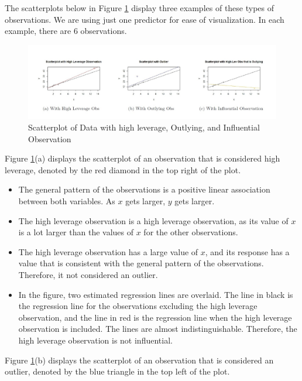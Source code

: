 \documentclass[
]{book}
\providecommand{\tightlist}{%
  \setlength{\itemsep}{0pt}\setlength{\parskip}{0pt}}
\begin{document}
The scatterplots below in Figure \ref{fig:10plots} display three examples of these types of observations. We are using just one predictor for ease of visualization. In each example, there are 6 observations.

\begin{figure}
\centering
\includegraphics{images/10plots.jpg}
\caption{\label{fig:10plots}Scatterplot of Data with high leverage, Outlying, and Influential Observation}
\end{figure}

Figure \ref{fig:10plots}(a) displays the scatterplot of an observation that is considered high leverage, denoted by the red diamond in the top right of the plot.

\begin{itemize}
\tightlist
\item
  The general pattern of the observations is a positive linear association between both variables. As \(x\) gets larger, \(y\) gets larger.
\item
  The high leverage observation is a high leverage observation, as its value of \(x\) is a lot larger than the values of \(x\) for the other observations.
\item
  The high leverage observation has a large value of \(x\), and its response has a value that is consistent with the general pattern of the observations. Therefore, it not considered an outlier.
\item
  In the figure, two estimated regression lines are overlaid. The line in black is the regression line for the observations excluding the high leverage observation, and the line in red is the regression line when the high leverage observation is included. The lines are almost indistinguishable. Therefore, the high leverage observation is not influential.
\end{itemize}

Figure \ref{fig:10plots}(b) displays the scatterplot of an observation that is considered an outlier, denoted by the blue triangle in the top left of the plot.
\end{document}
